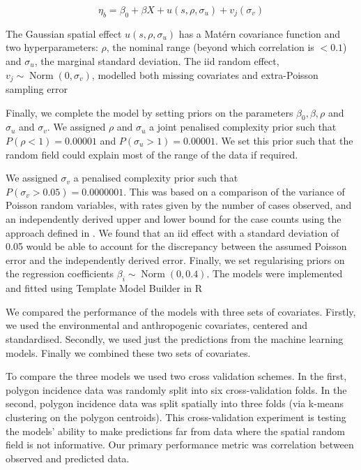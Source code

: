 \documentclass[11pt]{article}
\begin{document}
$$\eta_b = \beta_0 + \beta X  + u(s, \rho, \sigma_u) + v_j(\sigma_v)$$

The Gaussian spatial effect $u(s, \rho, \sigma_u)$ has a Mat\'ern covariance function and two hyperparameters: $\rho$, the nominal range (beyond which correlation is $< 0.1$) and $\sigma_u$, the marginal standard deviation.
The iid random effect, $v_j \sim \operatorname{Norm}(0, \sigma_v)$, modelled both missing covariates and extra-Poisson sampling error

Finally, we complete the model by setting priors on the parameters $\beta_0, \beta, \rho$ and $\sigma_u$ and $\sigma_v$. 
We assigned $\rho$ and $\sigma_u$ a joint penalised complexity prior \citep{fuglstad2018constructing} such that $P(\rho < 1) = 0.00001$ and $P(\sigma_u > 1) = 0.00001$. 
We set this prior such that the random field could explain most of the range of the data if required.

We assigned $\sigma_v$ a penalised complexity prior \citep{simpson2017penalising} such that $P(\sigma_v > 0.05) = 0.0000001$. 
This was based on a comparison of the variance of Poisson random variables, with rates given by the number of cases observed, and an independently derived upper and lower bound for the case counts using the approach defined in \citep{cibulskis2011worldwide}. 
We found that an iid effect with a standard deviation of 0.05 would be able to account for the discrepancy between the assumed Poisson error and the independently derived error.
Finally, we set regularising priors on the regression coefficients $\beta_i \sim \operatorname{ Norm}(0, 0.4)$. 
The models were implemented and fitted using Template Model Builder \citep{TMB} in R \citep{R}

We compared the performance of the models with three sets of covariates.
Firstly, we used the environmental and anthropogenic covariates, centered and standardised.
Secondly, we used just the predictions from the machine learning models.
Finally we combined these two sets of covariates.

To compare the three models we used two cross validation schemes. 
In the first, polygon incidence data was randomly split into six cross-validation folds.
In the second, polygon incidence data was split spatially into three folds (via k-means clustering on the polygon centroids).
This cross-validation experiment is testing the models’ ability to make predictions far from data where the spatial random field is not informative.
Our primary performance metric was correlation between observed and predicted data.
\end{document}
